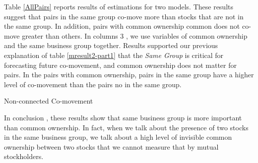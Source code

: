 					Table \ref{AllPairs} reports results of estimations for two models. These results suggest that pairs in the same group co-move more than stocks that are not in the same group. In addition, pairs with common ownership common does not co-move greater than others. In columns 3 , we use variables of common ownership and the same business group together. Results supported our previous explanation of table \ref{mresult2-part1} that the \textit{Same Group} is critical for forecasting future co-movement, and common ownership does not matter for pairs. In the pairs with common ownership, pairs in the same group have a higher level of co-movement than the pairs no in the same group.
					
					{\begin{table}[htbp]
							\caption{Non-connected Co-movement}
							\label{AllPairs}
							\resizebox{1\textwidth}{!}{
								
									{	
									}
							}
					\end{table}}
					
				
					
					
					
					In conclusion , these results show that same business group is more important than common ownership. In fact, when we talk about the presence of two stocks in the same business group, we talk about a high level of invisible common ownership between two stocks that we cannot measure that by mutual stockholders.
					
					
					\FloatBarrier
